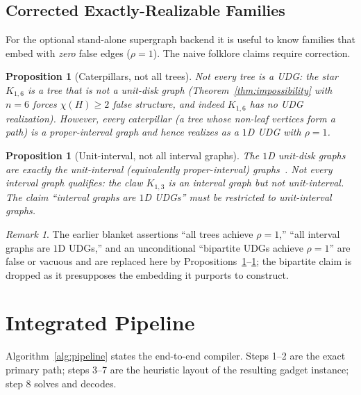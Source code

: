 \documentclass[11pt]{article}
\newtheorem{proposition}[theorem]{Proposition}
\theoremstyle{definition}
\theoremstyle{remark}
\newtheorem{remark}[theorem]{Remark}
\begin{document}
\subsection{Corrected Exactly-Realizable Families}
\label{sec:families}

For the optional stand-alone supergraph backend it is useful to know families that
embed with \emph{zero} false edges ($\rho=1$). The naive folklore claims require
correction.

\begin{proposition}[Caterpillars, not all trees]
\label{prop:caterpillar}
Not every tree is a UDG: the star $K_{1,6}$ is a tree that is not a unit-disk
graph (Theorem~\ref{thm:impossibility} with $n=6$ forces $\chi(H)\ge 2$ false
structure, and indeed $K_{1,6}$ has no UDG realization). However, every
\emph{caterpillar} (a tree whose non-leaf vertices form a path) is a proper-interval
graph and hence realizes as a $1$D UDG with $\rho=1$.
\end{proposition}

\begin{proposition}[Unit-interval, not all interval graphs]
\label{prop:unitinterval}
The $1$D unit-disk graphs are exactly the \emph{unit-interval} (equivalently
proper-interval) graphs~\cite{Roberts1969,Golumbic1980}. Not every interval graph
qualifies: the claw $K_{1,3}$ is an interval graph but not unit-interval. The claim
``interval graphs are $1$D UDGs'' must be restricted to unit-interval graphs.
\end{proposition}

\begin{remark}
The earlier blanket assertions ``all trees achieve $\rho=1$,'' ``all interval
graphs are $1$D UDGs,'' and an unconditional ``bipartite UDGs achieve $\rho=1$''
are false or vacuous and are replaced here by
Propositions~\ref{prop:caterpillar}--\ref{prop:unitinterval}; the bipartite claim
is dropped as it presupposes the embedding it purports to construct.
\end{remark}

\section{Integrated Pipeline}
\label{sec:pipeline}

Algorithm~\ref{alg:pipeline} states the end-to-end compiler. Steps 1--2 are the
exact primary path; steps 3--7 are the heuristic layout of the resulting gadget
instance; step 8 solves and decodes.
\end{document}

